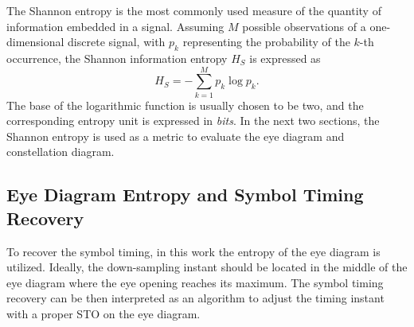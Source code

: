 \documentclass[12pt, draftclsnofoot, onecolumn]{IEEEtran}
\begin{document}
The Shannon entropy is the most commonly used measure of the quantity of information  embedded in a signal.
Assuming \(M\) possible observations of a one-dimensional discrete signal, with \(p_k\) representing the probability of the \(k\)-th occurrence, the Shannon information entropy \(H_S\) is expressed as~\cite{Shannon1948}
\begin{equation}
H_S =  - \sum\limits_{k = 1}^M {{p_k}\log {p_k}}.
\label{eq:entropy}
\end{equation}
The base of the logarithmic function is usually chosen to be two, and the corresponding entropy unit is expressed in \textit{bits}.
In the next two sections, the Shannon entropy is used as a metric to evaluate the eye diagram and constellation diagram.

\subsection{Eye Diagram Entropy and Symbol Timing Recovery}
\label{sec:eye_entp}
To recover the symbol timing, in this work the entropy of the eye diagram is utilized. 
Ideally, the down-sampling instant should be located in the middle of the eye diagram where the eye opening reaches its maximum.
The symbol timing recovery can be then interpreted as an algorithm to adjust the timing instant with a proper STO on the eye diagram.
\end{document}
